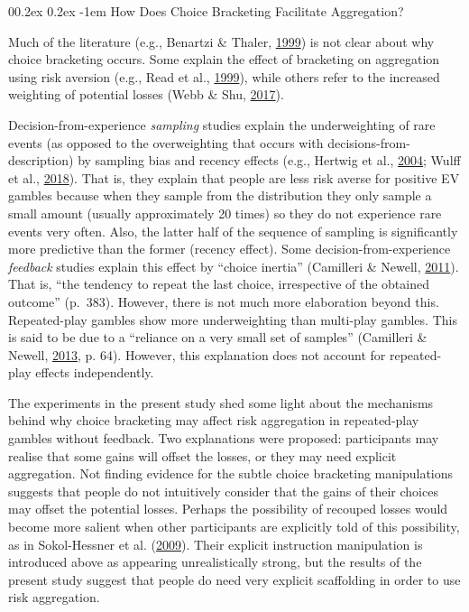 \documentclass[
  english,
  man, donotrepeattitle,floatsintext]{apa7}
\makeatletter
\let\oldparagraph\paragraph
\renewcommand{\paragraph}[1]{\oldparagraph{#1}\mbox{}}
\renewcommand{\paragraph}{\@startsection{paragraph}{4}{\parindent}%
  {0\baselineskip \@plus 0.2ex \@minus 0.2ex}%
  {-1em}%
  {\normalfont\normalsize\bfseries\itshape\typesectitle}}
\theoremstyle{definition}
\theoremstyle{definition}
\theoremstyle{definition}
\theoremstyle{definition}
\theoremstyle{remark}
\makeatother
\begin{document}
\hypertarget{how-does-choice-bracketing-facilitate-aggregation}{%
\paragraph{How Does Choice Bracketing Facilitate Aggregation?}\label{how-does-choice-bracketing-facilitate-aggregation}}

Much of the literature (e.g., Benartzi \& Thaler, \protect\hyperlink{ref-benartzi1999}{1999}) is not clear about why choice
bracketing occurs. Some explain the effect of bracketing on aggregation using
risk aversion (e.g., Read et al., \protect\hyperlink{ref-read1999}{1999}), while others refer to the increased weighting
of potential losses (Webb \& Shu, \protect\hyperlink{ref-webb2017}{2017}).

Decision-from-experience \emph{sampling} studies explain the underweighting of rare
events (as opposed to the overweighting that occurs with
decisions-from-description) by sampling bias and recency effects (e.g., Hertwig et al., \protect\hyperlink{ref-hertwig2004}{2004}; Wulff et al., \protect\hyperlink{ref-wulff2018}{2018}). That is, they explain that people are less risk
averse for positive EV gambles because when they sample from the distribution
they only sample a small amount (usually approximately 20 times) so they do not
experience rare events very often. Also, the latter half of the sequence of
sampling is significantly more predictive than the former (recency effect). Some
decision-from-experience \emph{feedback} studies explain this effect by ``choice
inertia'' (Camilleri \& Newell, \protect\hyperlink{ref-camilleri2011}{2011}). That is, ``the tendency to repeat the last choice,
irrespective of the obtained outcome'' (p.~383). However, there is not much more
elaboration beyond this. Repeated-play gambles show more underweighting than
multi-play gambles. This is said to be due to a ``reliance on a very small set of
samples'' (Camilleri \& Newell, \protect\hyperlink{ref-camilleri2013}{2013}, p. 64). However, this explanation does not account for
repeated-play effects independently.

The experiments in the present study shed some light about the mechanisms behind why
choice bracketing may affect risk aggregation in repeated-play gambles without
feedback. Two explanations were proposed: participants may realise that some
gains will offset the losses, or they may need explicit aggregation. Not finding
evidence for the subtle choice bracketing manipulations suggests that people do
not intuitively consider that the gains of their choices may offset the
potential losses. Perhaps the possibility of recouped losses would become more
salient when other participants are explicitly told of this possibility, as in
Sokol-Hessner et al. (\protect\hyperlink{ref-sokolhessner2009}{2009}). Their explicit instruction manipulation is introduced above
as appearing unrealistically strong, but the results of the present study suggest
that people do need very explicit scaffolding in order to use risk aggregation.
\end{document}
